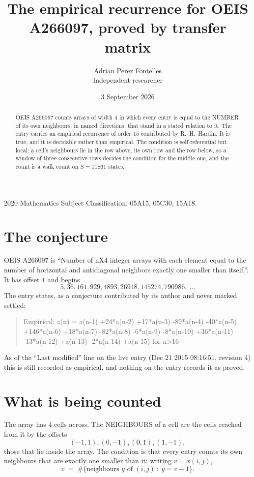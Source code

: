 \documentclass[11pt,a4paper]{article}
\title{The empirical recurrence for OEIS A266097, proved by transfer matrix}
\author{Adrian Perez Fontelles\\ \small Independent researcher}
\date{3 September 2026}
\theoremstyle{plain}
\theoremstyle{definition}
\begin{document}
\maketitle

\begin{abstract}
OEIS A266097 counts arrays of width $4$ in which every entry is equal to the NUMBER of its own
neighbours, in named directions, that stand in a stated relation to it. The entry carries an
empirical recurrence of order $15$ contributed by R.~H.~Hardin. It is true, and it is
decidable rather than empirical. The condition is self-referential but local: a cell's
neighbours lie in the row above, its own row and the row below, so a window of three
consecutive rows decides the condition for the middle one, and the count is a walk count on
$S=11861$ states.
\end{abstract}

\noindent\small 2020 Mathematics Subject Classification. 05A15, 05C30, 15A18.\normalsize

\section{The conjecture}

OEIS A266097 is ``Number of nX4 integer arrays with each element equal to the number of horizontal and antidiagonal neighbors exactly one smaller than itself.''. It has offset $1$ and begins
\[
5, 36, 161, 929, 4893, 26948, 145274, 790986,\ \dots
\]
The entry states, as a conjecture contributed by its author and never marked settled:
\begin{quote}
Empirical: a(n) = a(n-1) +24*a(n-2) +17*a(n-3) -89*a(n-4) -40*a(n-5) +146*a(n-6) +18*a(n-7) -82*a(n-8) -6*a(n-9) -8*a(n-10) +36*a(n-11) -13*a(n-12) +a(n-13) -2*a(n-14) +a(n-15) for n>16
\end{quote}
As of the ``Last modified'' line on the live entry (Dec 21 2015 08:16:51, revision 4) this is still
recorded as empirical, and nothing on the entry records it as proved.

\section{What is being counted}

The array has $4$ cells across. The NEIGHBOURS of a cell are the cells reached from it by the
offsets
\[
(-1,1), (0,-1), (0,1), (1,-1),
\]
those that lie inside the array. The condition is that every entry counts its own neighbours
that are exactly one smaller than it: writing $v=x(i,j)$,
\[
v\;=\;\#\{\text{neighbours } y \text{ of } (i,j)\ :\ y=v-1\} .
\]
\end{document}
